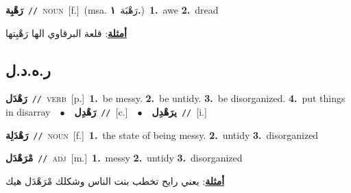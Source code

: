 \documentclass[10pt,a4paper,twoside]{article} %
\begin{document}
\begin{multicols}{2}
{\setlength\topsep{0pt}\textbf{\foreignlanguage{arabic}{رَهْبِة}}\ {\color{gray}\texttt{//}\color{black}}\ \textsc{noun}\ [f.]\ \color{gray}(msa. \foreignlanguage{arabic}{رَهْبَة}~\foreignlanguage{arabic}{\textbf{١.}})\color{black}\ \textbf{1.}~awe  \textbf{2.}~dread\  \begin{flushright}\color{gray}\foreignlanguage{arabic}{\textbf{\underline{\foreignlanguage{arabic}{أمثلة}}}: قلعة البرقاوي الها رَهْبِتها}\end{flushright}\color{black}} \vspace{2mm}

\vspace{-3mm}
\subsection*{\color{blue}\foreignlanguage{arabic}{ر.ه.د.ل}\color{blue}{}} 

{\setlength\topsep{0pt}\textbf{\foreignlanguage{arabic}{رَهْدَل}}\ {\color{gray}\texttt{//}\color{black}}\ \textsc{verb}\ [p.]\ \textbf{1.}~be messy.  \textbf{2.}~be untidy.  \textbf{3.}~be disorganized.  \textbf{4.}~put things in disarray\ \ $\bullet$\ \ \setlength\topsep{0pt}\textbf{\foreignlanguage{arabic}{رَهْدِل}}\ {\color{gray}\texttt{//}\color{black}}\ [c.]\ \ $\bullet$\ \ \setlength\topsep{0pt}\textbf{\foreignlanguage{arabic}{يرَهْدِل}}\ {\color{gray}\texttt{//}\color{black}}\ [i.]\ } \vspace{2mm}

{\setlength\topsep{0pt}\textbf{\foreignlanguage{arabic}{رَهْدَلِة}}\ {\color{gray}\texttt{//}\color{black}}\ \textsc{noun}\ [f.]\ \textbf{1.}~the state of being messy.  \textbf{2.}~untidy  \textbf{3.}~disorganized\ } \vspace{2mm}

{\setlength\topsep{0pt}\textbf{\foreignlanguage{arabic}{مْرَهْدَل}}\ {\color{gray}\texttt{//}\color{black}}\ \textsc{adj}\ [m.]\ \textbf{1.}~messy  \textbf{2.}~untidy  \textbf{3.}~disorganized\  \begin{flushright}\color{gray}\foreignlanguage{arabic}{\textbf{\underline{\foreignlanguage{arabic}{أمثلة}}}: يعني رايح تخطب بنت الناس وشكلك مْرَهْدَل هيك}\end{flushright}\color{black}} \vspace{2mm}


\end{multicols}
\end{document}
